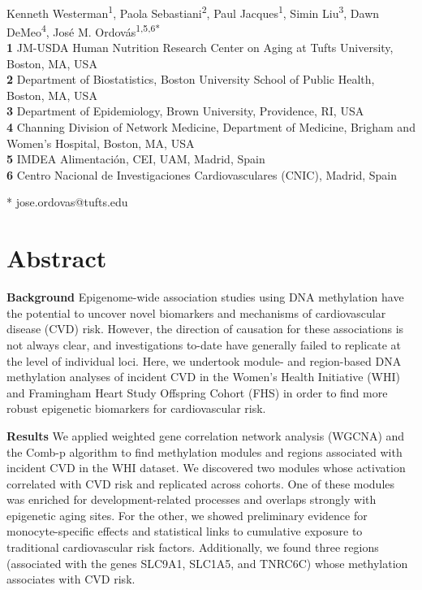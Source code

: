 \documentclass[]{bmcart}
\title{}
\author{}
\date{}
\theoremstyle{definition}
\theoremstyle{definition}
\theoremstyle{definition}
\theoremstyle{remark}
\begin{document}
\begin{flushleft}
{\Large
\textbf{}
}
\newline
\\
Kenneth Westerman\textsuperscript{1},
Paola Sebastiani\textsuperscript{2},
Paul Jacques\textsuperscript{1},
Simin Liu\textsuperscript{3},
Dawn DeMeo\textsuperscript{4},
Jos\'e M. Ordov\'as\textsuperscript{1,5,6*}
\\
\bigskip
\textbf{1} JM-USDA Human Nutrition Research Center on Aging at Tufts University, Boston, MA, USA
\\
\textbf{2} Department of Biostatistics, Boston University School of Public Health, Boston, MA, USA
\\
\textbf{3} Department of Epidemiology, Brown University, Providence, RI, USA
\\
\textbf{4} Channing Division of Network Medicine, Department of Medicine, Brigham and Women's Hospital, Boston, MA, USA
\\
\textbf{5} IMDEA Alimentaci\'on, CEI, UAM, Madrid, Spain
\\
\textbf{6} Centro Nacional de Investigaciones Cardiovasculares (CNIC), Madrid, Spain
\\
\bigskip

* jose.ordovas@tufts.edu

\end{flushleft}

\section{Abstract}\label{abstract}

\textbf{Background} Epigenome-wide association studies using DNA
methylation have the potential to uncover novel biomarkers and
mechanisms of cardiovascular disease (CVD) risk. However, the direction
of causation for these associations is not always clear, and
investigations to-date have generally failed to replicate at the level
of individual loci. Here, we undertook module- and region-based DNA
methylation analyses of incident CVD in the Women's Health Initiative
(WHI) and Framingham Heart Study Offspring Cohort (FHS) in order to find
more robust epigenetic biomarkers for cardiovascular risk.

\textbf{Results} We applied weighted gene correlation network analysis
(WGCNA) and the Comb-p algorithm to find methylation modules and regions
associated with incident CVD in the WHI dataset. We discovered two
modules whose activation correlated with CVD risk and replicated across
cohorts. One of these modules was enriched for development-related
processes and overlaps strongly with epigenetic aging sites. For the
other, we showed preliminary evidence for monocyte-specific effects and
statistical links to cumulative exposure to traditional cardiovascular
risk factors. Additionally, we found three regions (associated with the
genes SLC9A1, SLC1A5, and TNRC6C) whose methylation associates with CVD
risk.
\end{document}
